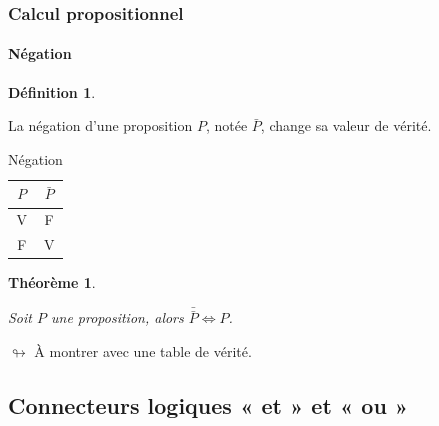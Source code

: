 \documentclass[10pt,notheorems]{beamer}
\theoremstyle{plain}
\newtheorem{theorem}{Théorème}
\theoremstyle{definition} %
\newtheorem{definition}{Définition}
\begin{document}
  \begin{frame}
    \frametitle{Calcul propositionnel}
    \framesubtitle{Négation}
    \hypertarget{slide_negation}{}

    \begin{definition}\label{definition:negation}

    La négation d'une proposition $P$, notée $\bar P$, change sa
    valeur de vérité.
  \end{definition}

  \bigskip

  \begin{table}[H]

     \centering
     \begin{tabular}[H]{|c|c|}
       \hline
       $P$ & $\bar P$\\ \hline
       V & F \\
       F & V \\
       \hline\hline
     \end{tabular}
     \caption{Négation}
     \label{tab:negation}
   \end{table}

   \begin{theorem}\label{theorem:negation}

      Soit $P$ une proposition, alors
      $\bar{\bar P} \Leftrightarrow P$.
    \end{theorem}

    \medskip

    $\looparrowright$ À montrer avec une table de vérité.
  \end{frame}


  \subsection{Connecteurs logiques « et » et « ou »}
\end{document}
